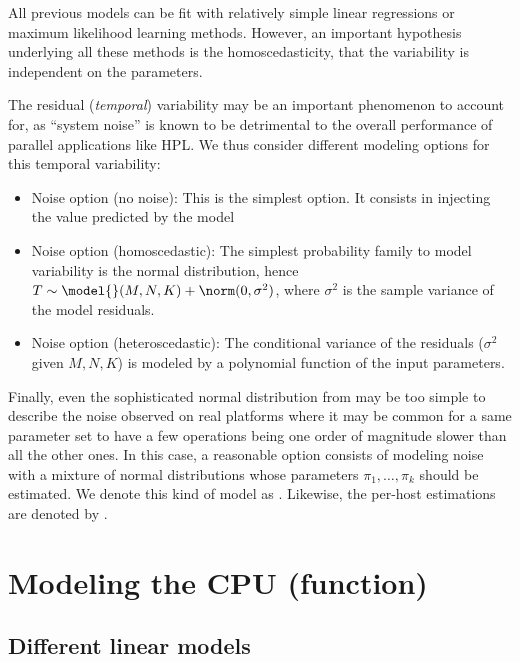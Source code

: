         All previous models can be fit with relatively simple linear regressions or maximum likelihood learning methods.
        However, an important hypothesis underlying all these methods is the homoscedasticity, \ie that the variability
        is independent on the parameters.

        The residual (\emph{temporal}) variability may be an important phenomenon to account for, as ``system noise'' is
        known to be detrimental to the overall performance of parallel applications like HPL. We thus consider different
        modeling options for this temporal variability:
        \begin{itemize}
            \item Noise option  (no noise): This is the simplest option. It consists in injecting the value
                predicted by the model
            \item Noise option  (homoscedastic): The simplest probability family to model variability is the
                normal distribution, hence \(T \sim \model{}(M,N,K) + \norm(0,\sigma^2)\), where \(\sigma^2\) is the
                sample variance of the model residuals.
            \item Noise option  (heteroscedastic): The conditional variance of the residuals (\ie \(\sigma^2\)
                given \(M,N,K\)) is modeled by a polynomial function of the input parameters.
        \end{itemize}
        Finally, even the sophisticated normal distribution from  may be too simple to describe the noise
        observed on real platforms where it may be common for a same parameter set to have a few operations being one
        order of magnitude slower than all the other ones. In this case, a reasonable option consists of modeling noise
        with a mixture of normal distributions whose parameters \(\pi_1 , \dots, \pi_k\) should be estimated. We denote
        this kind of model as \noisep{}. Likewise, the per-host estimations are denoted by \noise[H]{}.

    \section{Modeling  the CPU (\ie \dgemm function)}
    \label{sec:dgemm_model}

        \subsection{Different linear models}%
        \label{sub:dgemm_model:different_models}

